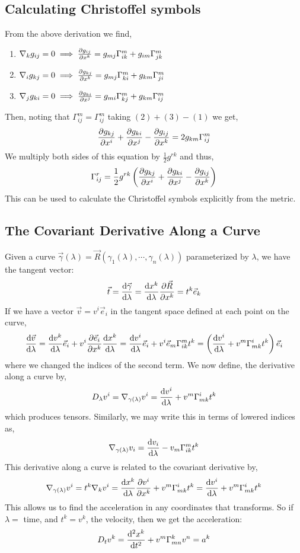 \documentclass[11pt, a4paper]{article}
\begin{document}
\subsection{Calculating Christoffel symbols}
From the above derivation we find, 
\begin{enumerate}
    \item $\nabla_kg_{ij} = 0 \implies \frac{\partial{g_{ij}}}{\partial{x^k}} = g_{mj}\Gamma^m_{ik} + g_{im}\Gamma^m_{jk}$
    \item $\nabla_ig_{kj} = 0 \implies \frac{\partial{g_{kj}}}{\partial{x^k}} = g_{mj}\Gamma^m_{ki} + g_{km}\Gamma^m_{ji}$
    \item $\nabla_jg_{ki} = 0 \implies \frac{\partial{g_{ki}}}{\partial{x^j}} = g_{mi}\Gamma^m_{kj} + g_{km}\Gamma^m_{ij}$
\end{enumerate}
Then, noting that $\Gamma^m_{ij} = \Gamma^m_{ij}$ taking  $(2)+(3)-(1)$ we get,
\[\frac{\partial{g_{kj}}}{\partial{x^i}} + \frac{\partial{g_{ki}}}{\partial{x^j}} - \frac{\partial{g_{ij}}}{\partial{x^k}} = 2g_{km}\Gamma^m_{ij}\]
We multiply both sides of this equation by $\frac{1}{2}g^{rk}$ and thus, 
\[\Gamma^r_{ij}  = \frac{1}{2}g^{rk}\left(\frac{\partial{g_{kj}}}{\partial{x^i}} + \frac{\partial{g_{ki}}}{\partial{x^j}} - \frac{\partial{g_{ij}}}{\partial{x^k}}\right)\]
This can be used to calculate the Christoffel symbols explicitly from the metric.

\subsection{The Covariant Derivative Along a Curve}

Given a curve $\vec{\gamma}(\lambda) = \vec{R}(\gamma_1(\lambda), \cdots, \gamma_n(\lambda))$ parameterized by $\lambda$, we have the tangent vector: 
\[\vec{t} = \frac{\mathrm{d}\vec{\gamma}}{\mathrm{d}\lambda} = \frac{\mathrm{d}x^k}{\mathrm{d}\lambda} \frac{\partial{\vec{R}}}{\partial{x^k}} = t^k\vec{e}_k\]
If we have a vector $\vec{v} = v^i\vec{e}_i$ in the tangent space defined at each point on the curve,
\begin{align*}
\frac{\mathrm{d}\vec{v}}{\mathrm{d}\lambda} = \frac{\mathrm{d}v^k}{\mathrm{d}\lambda}\vec{e}_i + v^i \frac{\partial{\vec{e}_i}}{\partial{x^k}} \frac{\mathrm{d}x^k}{\mathrm{d}\lambda} = \frac{\mathrm{d}v^i}{\mathrm{d}\lambda} \vec{e}_i + v^i\vec{e}_m\Gamma^m_{ik}t^k = \left(\frac{\mathrm{d}v^i}{\mathrm{d}\lambda} + v^m\Gamma^i_{mk}t^k \right) \vec{e}_i
\end{align*}
where we changed the indices of the second term.  We now define, the derivative along a curve by, 
\[D_\lambda v^i = \nabla_{\gamma(\lambda)} v^i = \frac{\mathrm{d}v^i}{\mathrm{d}\lambda} + v^m\Gamma^i_{mk}t^k\]
which produces tensors.  Similarly, we may write this in terms of lowered indices as, 
\[\nabla_{\gamma(\lambda)} v_i = \frac{\mathrm{d}v_i}{\mathrm{d}\lambda} - v_m\Gamma^m_{ik}t^k\]
This derivative along a curve is related to the covariant derivative by, 
\[\nabla_{\gamma(\lambda)}v^i = t^k \nabla_k v^i = \frac{\mathrm{d}x^k}{\mathrm{d}\lambda} \frac{\partial{v^i}}{\partial{x^k}} + v^m\Gamma^i_{mk}t^k = \frac{\mathrm{d}v^i}{\mathrm{d}\lambda} + v^m\Gamma^i_{mk}t^k\]
This allows us to find the acceleration in any coordinates that transforms.  So if $\lambda = $ time, and $t^k = v^k$, the velocity, then we get the acceleration: 
\[ D_t v^k = \frac{\mathrm{d}^{2} x^k}{\mathrm{d}t^{2}} + v^m\Gamma^k_{mn} v^n = a^k\]
\end{document}
